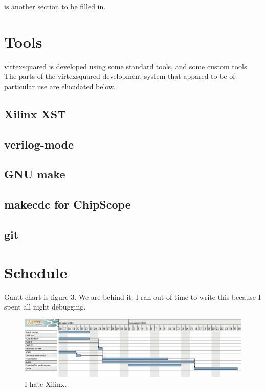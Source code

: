 \documentclass[10pt,twocolumn]{article}
\begin{document}
is another section to be filled in.

\section{Tools}

virtexsquared is developed using some standard tools, and some custom tools. 
The parts of the virtexsquared development system that appared to be of
particular use are elucidated below.

\subsection{Xilinx XST}

\subsection{verilog-mode}

\subsection{GNU make}

\subsection{makecdc for ChipScope}

\subsection{git}

\section{Schedule}

Gantt chart is figure 3.  We are behind it.  I ran out of time to write
this because I spent all night debugging.

\begin{figure}
  \centering
    \includegraphics[width=\textwidth]{gantt-chart.png}
  \caption{I hate Xilinx.} \label{mshim_clock}
\end{figure}
\end{document}
